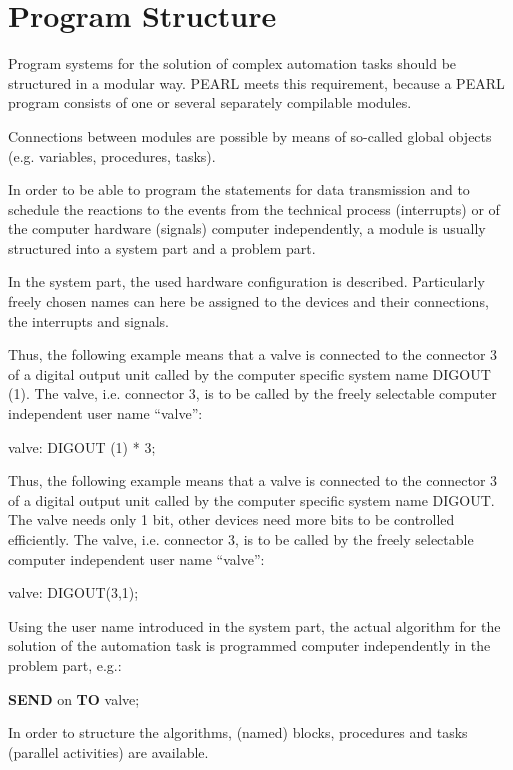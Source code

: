 \section{Program Structure}   %

Program systems for the solution of complex automation tasks should be
structured in a modular way. PEARL meets this requirement, because a
PEARL program consists of one or several separately compilable
modules.

Connections between modules are possible by means of so-called global
objects (e.g. variables, procedures, tasks).

In order to be able to program the statements for data transmission
and to schedule the reactions to the events from the technical process
(interrupts) or of the computer hardware (signals) computer
independently, a module is usually structured into a system part and a
problem part.

In the system part, the used hardware configuration is described.
Particularly freely chosen names can here be assigned to the devices and
their connections, the interrupts and signals. 

\begin{removed}
Thus, the following
example means that a valve is connected to the connector 3 of a digital
output unit called by the computer specific system name DIGOUT (1). The
valve, i.e. connector 3, is to be called by the freely selectable
computer independent user name ``valve'':

valve: DIGOUT (1) * 3;
\end{removed}

\begin{added}
Thus, the following
example means that a valve is connected to the connector 3
 of a digital
output unit called by the computer specific system name DIGOUT.
The valve needs only 1 bit, other devices need more bits to be controlled
efficiently.
The valve, i.e. connector 3, is to be called by the freely selectable
computer independent user name ``valve'':

valve: DIGOUT(3,1);
\end{added}

Using the user name introduced in the system part, the actual algorithm
for the solution of the automation task is programmed computer
independently in the problem part, e.g.:

{\bf SEND} on {\bf TO} valve;

In order to structure the algorithms, (named) blocks, procedures and
tasks (parallel activities) are available.

